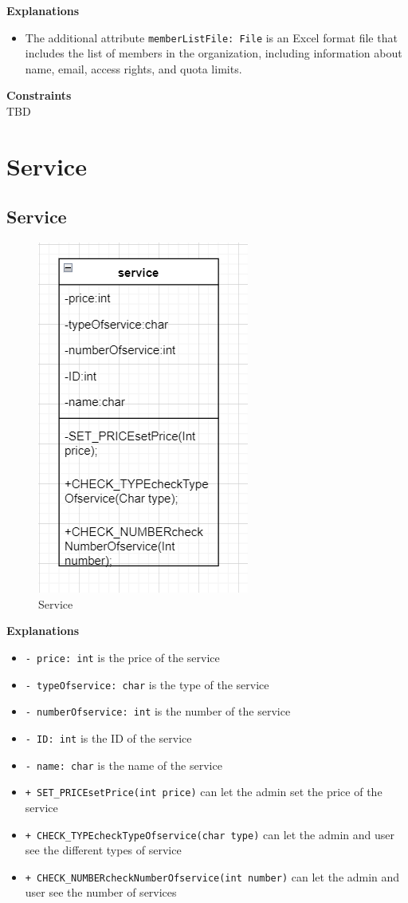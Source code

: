 \textbf{Explanations}
\begin{itemize}
    \item The additional attribute \texttt{memberListFile: File} is an Excel format file that includes the list of members in the organization, including information about name, email, access rights, and quota limits.
\end{itemize}

\textbf{Constraints} \\
TBD

\section{Service}

\subsection{Service}
\begin{figure}[H]
    \centering
    \includegraphics[width=0.3\linewidth]{picture/3-4/3-4-1.png}
    \caption{Service}
    \label{fig:enter-label}
\end{figure}

\textbf{Explanations}
\begin{itemize}
    \item \texttt{- price: int} is the price of the service
    \item \texttt{- typeOfservice: char} is the type of the service
    \item \texttt{- numberOfservice: int} is the number of the service
    \item \texttt{- ID: int} is the ID of the service
    \item \texttt{- name: char} is the name of the service
\end{itemize}

\begin{itemize}
    \item \texttt{+ SET\_PRICEsetPrice(int price)} can let the admin set the price of the service
    \item \texttt{+ CHECK\_TYPEcheckTypeOfservice(char type)} can let the admin and user see the different types of service
    \item \texttt{+ CHECK\_NUMBERcheckNumberOfservice(int number)} can let the admin and user see the number of services
\end{itemize}

